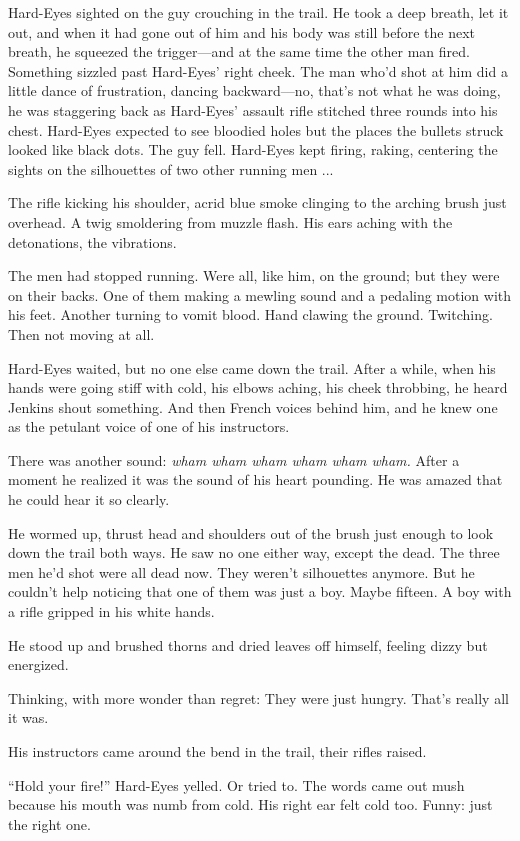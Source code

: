 Hard-Eyes sighted on the guy crouching in the trail. He took a deep breath, let it out, and when it had gone out of him and his body was still before the next breath, he squeezed the trigger---and at the same time the other man fired. Something sizzled past Hard-Eyes' right cheek. The man who'd shot at him did a little dance of frustration, dancing backward---no, that's not what he was doing, he was staggering back as Hard-Eyes' assault rifle stitched three rounds into his chest. Hard-Eyes expected to see bloodied holes but the places the bullets struck looked like black dots. The guy fell. Hard-Eyes kept firing, raking, centering the sights on the silhouettes of two other running men ...

The rifle kicking his shoulder, acrid blue smoke clinging to the arching brush just overhead. A twig smoldering from muzzle flash. His ears aching with the detonations, the vibrations.

The men had stopped running. Were all, like him, on the ground; but they were on their backs. One of them making a mewling sound and a pedaling motion with his feet. Another turning to vomit blood. Hand clawing the ground. Twitching. Then not moving at all.

Hard-Eyes waited, but no one else came down the trail. After a while, when his hands were going stiff with cold, his elbows aching, his cheek throbbing, he heard Jenkins shout something. And then French voices behind him, and he knew one as the petulant voice of one of his instructors.

There was another sound: \textit{wham wham wham wham wham wham.} After a moment he realized it was the sound of his heart pounding. He was amazed that he could hear it so clearly.

He wormed up, thrust head and shoulders out of the brush just enough to look down the trail both ways. He saw no one either way, except the dead. The three men he'd shot were all dead now. They weren't silhouettes anymore. But he couldn't help noticing that one of them was just a boy. Maybe fifteen. A boy with a rifle gripped in his white hands.

He stood up and brushed thorns and dried leaves off himself, feeling dizzy but energized.

Thinking, with more wonder than regret: They were just hungry. That's really all it was.

His instructors came around the bend in the trail, their rifles raised.

``Hold your fire!'' Hard-Eyes yelled. Or tried to. The words came out mush because his mouth was numb from cold. His right ear felt cold too. Funny: just the right one.

